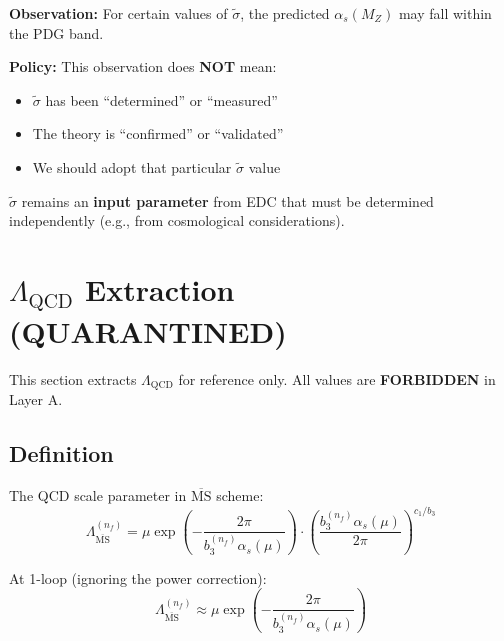 \documentclass[11pt,a4paper]{article}
\theoremstyle{definition}
\begin{document}
\begin{nofitbox}
\textbf{Observation:} For certain values of $\tilde{\sigma}$, the predicted
$\alpha_s(M_Z)$ may fall within the PDG band.

\textbf{Policy:} This observation does \textbf{NOT} mean:
\begin{itemize}
  \item $\tilde{\sigma}$ has been ``determined'' or ``measured''
  \item The theory is ``confirmed'' or ``validated''
  \item We should adopt that particular $\tilde{\sigma}$ value
\end{itemize}

$\tilde{\sigma}$ remains an \textbf{input parameter} from EDC that must be
determined independently (e.g., from cosmological considerations).
\end{nofitbox}

\section{$\Lambda_{\text{QCD}}$ Extraction (QUARANTINED)}
\label{sec:lambda-qcd}

\begin{quarantinebox}
This section extracts $\Lambda_{\text{QCD}}$ for reference only.
All values are \textbf{FORBIDDEN} in Layer A.
\end{quarantinebox}

\subsection{Definition}
\label{subsec:lambda-def}

The QCD scale parameter in $\overline{\text{MS}}$ scheme:
\begin{equation}
\label{eq:lambda-def}
\Lambda_{\overline{\text{MS}}}^{(n_f)} = \mu \exp\left(-\frac{2\pi}{b_3^{(n_f)} \alpha_s(\mu)}\right)
  \cdot \left(\frac{b_3^{(n_f)} \alpha_s(\mu)}{2\pi}\right)^{c_1/b_3}
\end{equation}

At 1-loop (ignoring the power correction):
\begin{equation}
\label{eq:lambda-1loop}
\boxed{\Lambda_{\overline{\text{MS}}}^{(n_f)} \approx \mu \exp\left(-\frac{2\pi}{b_3^{(n_f)} \alpha_s(\mu)}\right)}
\end{equation}
\end{document}
